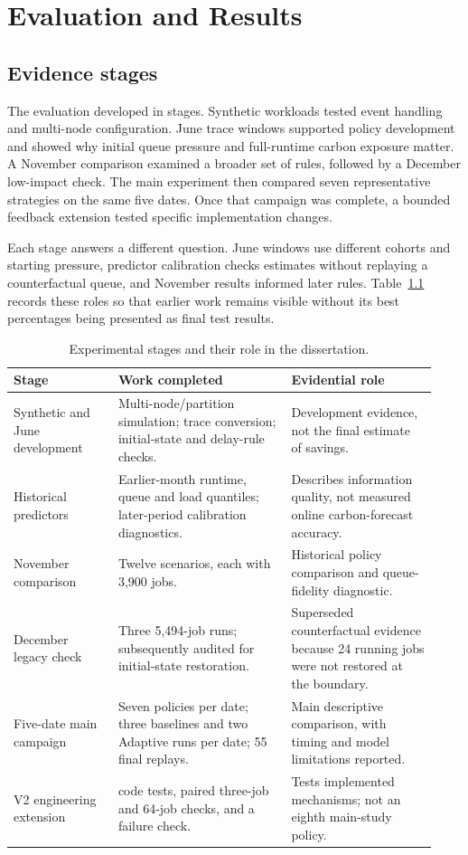 \chapter{Evaluation and Results}\label{ch:evaluation}
\section{Evidence stages}
The evaluation developed in stages. Synthetic workloads tested event handling and multi-node configuration. June trace windows supported policy development and showed why initial queue pressure and full-runtime carbon exposure matter. A November comparison examined a broader set of rules, followed by a December low-impact check. The main experiment then compared seven representative strategies on the same five dates. Once that campaign was complete, a bounded feedback extension tested specific implementation changes.

Each stage answers a different question. June windows use different cohorts and starting pressure, predictor calibration checks estimates without replaying a counterfactual queue, and November results informed later rules. Table~\ref{tab:evidence-stages} records these roles so that earlier work remains visible without its best percentages being presented as final test results.

\begin{table}[htbp]\centering\small
\caption{Experimental stages and their role in the dissertation.}\label{tab:evidence-stages}
\begin{tabular}{@{}>{\raggedright\arraybackslash}p{0.23\linewidth}>{\raggedright\arraybackslash}p{0.38\linewidth}>{\raggedright\arraybackslash}p{0.32\linewidth}@{}}\toprule
Stage & Work completed & Evidential role\\\midrule
Synthetic and June development & Multi-node/partition simulation; trace conversion; initial-state and delay-rule checks. & Development evidence, not the final estimate of savings.\\
Historical predictors & Earlier-month runtime, queue and load quantiles; later-period calibration diagnostics. & Describes information quality, not measured online carbon-forecast accuracy.\\
12 November comparison & Twelve scenarios, each with 3,900 jobs. & Historical policy comparison and queue-fidelity diagnostic.\\
8 December legacy check & Three 5,494-job runs; subsequently audited for initial-state restoration. & Superseded counterfactual evidence because 24 running jobs were not restored at the boundary.\\
Five-date main campaign & Seven policies per date; three baselines and two Adaptive runs per date; 55 final replays. & Main descriptive comparison, with timing and model limitations reported.\\
V2 engineering extension & 37 code tests, paired three-job and 64-job checks, and a failure check. & Tests implemented mechanisms; not an eighth main-study policy.\\\bottomrule
\end{tabular}
\end{table}

